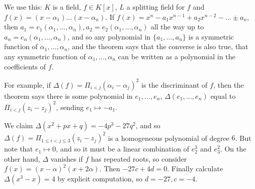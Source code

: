 \documentclass[a4paper, 10pt, twocolumn]{amsart}
\begin{document}
We use this: $K$ is a field, $f \in K[x]$, $L$ a splitting field for $f$ and $f(x) = (x-\alpha_1)\ldots(x-\alpha_n)$. If $f(x) = x^n - a_1x^{n-1} +a_2x^{n-2} - \ldots \pm a_n$, then $a_1 = e_1(\alpha_1, \ldots, \alpha_n), a_2 = e_2(\alpha_1, \ldots, \alpha_n)$ all the way up to $a_n = e_n(\alpha_1, \ldots, \alpha_n)$, and so any polynomial in $\{a_1, \ldots, a_n\}$ is a symmetric function of $\alpha_1, \ldots, \alpha_n$, and the theorem says that the converse is also true, that any symmetric function of $\alpha_1, \ldots, \alpha_n$ can be written as a polynomial in the coefficients of $f$.

For example, if $\Delta(f) = \Pi_{i<j} (\alpha_i-\alpha_j)^2$ is the discriminant of $f$, then the theorem says there is some polynomial in $e_1, \ldots, e_n$, $\Delta(e_1, \ldots, e_n)$ equal to $\Pi_{i<j} (z_i - z_j)^2$, sending $e_1 \mapsto -a_1$.

We claim $\Delta(x^2+px+q) = -4p^3 - 27q^2$, and so $\Delta(f) = \Pi_{1\leq i<j\leq 3} (z_i-z_j)^2$ is a homogeneous polynomial of degree $6$. But note that $e_1 \mapsto 0$, and so it must be a linear combination of $e_2^3$ and $e_3^2$. On the other hand, $\Delta$ vanishes if $f$ has repeated roots, so consider $f(x) = (x-\alpha)^2(x+2\alpha)$. Then $-27c+4d = 0$. Finally calculate $\Delta(x^3-x) = 4$ by explicit computation, so $d = -27, c = -4.$
\end{document}
